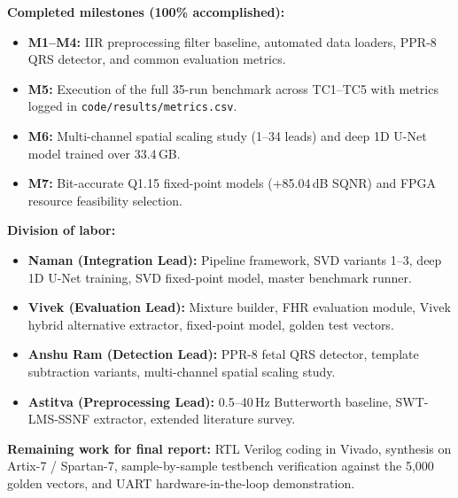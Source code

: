 \documentclass[10pt,twocolumn,letterpaper]{article}
\newcommand{\newcontent}[1]{\textcolor{midtermblue}{#1}}
\begin{document}
\newcontent{\noindent\textbf{Completed milestones (100\% accomplished):}
\begin{itemize}
    \item \textbf{M1--M4:} IIR preprocessing filter baseline, automated data loaders, PPR-8 QRS detector, and common evaluation metrics.
    \item \textbf{M5:} Execution of the full 35-run benchmark across TC1--TC5 with metrics logged in \texttt{code/results/metrics.csv}.
    \item \textbf{M6:} Multi-channel spatial scaling study (1--34 leads) and deep 1D U-Net model trained over 33.4\,GB.
    \item \textbf{M7:} Bit-accurate Q1.15 fixed-point models (+85.04\,dB SQNR) and FPGA resource feasibility selection.
\end{itemize}

\noindent\textbf{Division of labor:}
\begin{itemize}
    \item \textbf{Naman (Integration Lead):} Pipeline framework, SVD variants 1--3, deep 1D U-Net training, SVD fixed-point model, master benchmark runner.
    \item \textbf{Vivek (Evaluation Lead):} Mixture builder, FHR evaluation module, Vivek hybrid alternative extractor, fixed-point model, golden test vectors.
    \item \textbf{Anshu Ram (Detection Lead):} PPR-8 fetal QRS detector, template subtraction variants, multi-channel spatial scaling study.
    \item \textbf{Astitva (Preprocessing Lead):} 0.5--40\,Hz Butterworth baseline, SWT-LMS-SSNF extractor, extended literature survey.
\end{itemize}

\noindent\textbf{Remaining work for final report:} RTL Verilog coding in Vivado, synthesis on Artix-7 / Spartan-7, sample-by-sample testbench verification against the 5,000 golden vectors, and UART hardware-in-the-loop demonstration.
}
\end{document}
